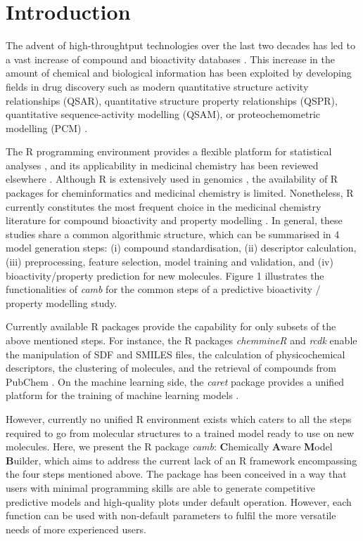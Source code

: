 \documentclass[twoside,a4wide,10pt]{article}
\begin{document}
\section*{Introduction}

The advent of high-throughtput technologies over the last two decades 
has led to a vast increase of compound and bioactivity databases \citep{bender_databases,chembl,pubchem}.
This increase in the amount of chemical and biological information 
has been exploited by developing fields in drug discovery 
such as modern quantitative structure activity relationships (QSAR), 
quantitative structure property relationships (QSPR), quantitative sequence-activity modelling (QSAM), 
or proteochemometric modelling (PCM) \citep{review_pcm,cortesReview}.

The R programming environment provides a flexible platform for statistical analyses \citep{Rlanguage},
and its applicability in medicinal chemistry has been reviewed elsewhere \citep{mente}.
Although R is extensively used in genomics \citep{bioconductor},
the availability of R packages for cheminformatics and medicinal chemistry is limited. %
Nonetheless, R currently constitutes the most frequent choice in the medicinal chemistry literature
for compound bioactivity and property modelling \citep{mente}.
In general, these studies share a common algorithmic structure, which can be summarised in 4 model generation steps:
(i) compound standardisation, (ii) descriptor calculation,
(iii) preprocessing, feature selection, model training and validation, and (iv) bioactivity/property prediction for new molecules.
Figure 1 illustrates the functionalities of {\it camb} for the common
steps of a predictive bioactivity / property modelling study.

Currently available R packages provide the capability for only subsets of the above mentioned steps.
For instance, the R packages {\it chemmineR} \citep{chemmineR} and {\it rcdk} \citep{rcdk} enable the manipulation of SDF and SMILES
files, the calculation of physicochemical descriptors, the clustering of molecules,
and the retrieval of compounds from PubChem \citep{pubchem}.
On the machine learning side, the {\it caret} package provides a
unified platform for the training of machine learning models \citep{caret}.

However, currently no unified R environment exists which caters to all the steps required to go from molecular structures to a trained model ready to use on new molecules.
Here, we present the R package {\it camb}: {\bf C}hemically {\bf A}ware {\bf M}odel {\bf B}uilder,
which aims to address the current lack of an R framework encompassing the four steps mentioned above.
The package has been conceived in a way that users with minimal
programming skills are able to generate competitive predictive models and high-quality plots
under default operation.
However, each function can be used with non-default parameters to fulfil the more versatile needs of more experienced users.
\end{document}
